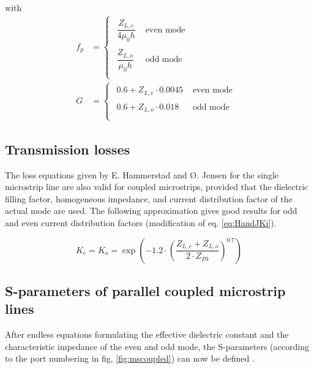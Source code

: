 \documentclass[10pt]{report}
\begin{document}
with
\begin{align}
f_{p} &=
\begin{cases}
\begin{array}{ll}
\dfrac{Z_{L,e}}{4\mu_{0} h} & \textrm{ even mode }\\&\\
\dfrac{Z_{L,o}}{\mu_{0} h}  & \textrm{ odd mode }\\
\end{array}
\end{cases}\\
G &=
\begin{cases}
\begin{array}{ll}
0.6 + Z_{L,e}\cdot 0.0045 & \textrm{ even mode }\\&\\
0.6 + Z_{L,o}\cdot 0.018 & \textrm{ odd mode }\\
\end{array}
\end{cases}
\end{align}

\subsection{Transmission losses}

The loss equations given by E. Hammerstad and {\O}. Jensen
\cite{Hammerstad} for the single microstrip line are also valid for
coupled microstrips, provided that the dielectric filling factor,
homogeneous impedance, and current distribution factor of the actual
mode are used.  The following approximation gives good results for odd
and even current distribution factors (modification of
eq. \eqref{eq:HandJKi}).

\begin{equation}
K_e = K_o = \exp{\left(-1.2\cdot\left(\dfrac{Z_{L,e} + Z_{L,o}}{2\cdot Z_{F0}}\right)^{0.7}\right)}
\end{equation}

\subsection{S-parameters of parallel coupled microstrip lines}

After endless equations formulating the effective dielectric constant
and the characte\-ris\-tic impe\-dance of the even and odd mode, the
S-parameters (according to the port numbering in
fig. \ref{fig:mscoupled}) can now be defined \cite{Edwards}.
\end{document}
